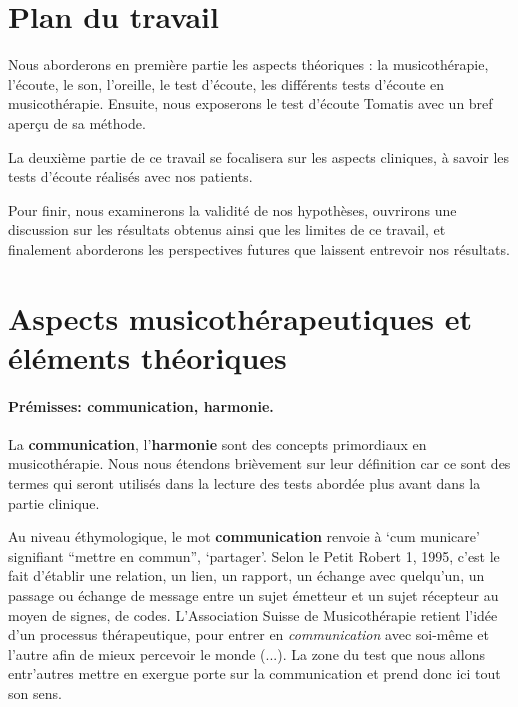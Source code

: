 	 


\section*{Plan du travail}


Nous aborderons en première partie les aspects théoriques : la musicothérapie, l'écoute, le son, l'oreille, le 
test d'écoute, les différents tests d'écoute en musicothérapie. Ensuite, nous 
exposerons le test d'écoute Tomatis avec un bref aperçu de sa méthode.

 
La deuxième partie de ce travail se focalisera sur les aspects
cliniques, à savoir les tests d'écoute réalisés  avec  nos patients. 

Pour finir, nous examinerons la validité de nos hypothèses, ouvrirons
une discussion sur les résultats obtenus ainsi que les limites de ce
travail, et finalement aborderons les perspectives futures que
laissent entrevoir nos résultats.



\section{{Aspects musicothérapeutiques et éléments théoriques}}


\paragraph{Prémisses: communication, harmonie.}



La \textbf{communication}, l'\textbf{harmonie} 
sont des concepts primordiaux en
musicothérapie. Nous nous étendons brièvement
sur leur définition car ce sont des termes qui seront utilisés dans la lecture
des tests abordée plus avant dans la partie clinique.

Au niveau éthymologique, le mot  \textbf{communication} renvoie à  `cum
municare' signifiant ``mettre en commun'', `partager'. Selon le Petit
Robert 1, 1995, c'est le fait d'établir une
relation, un lien, un rapport, un échange avec quelqu'un, un passage ou échange de message entre un sujet émetteur et un
sujet récepteur au moyen de signes, de codes. 
 L'Association Suisse de Musicothérapie retient l'idée d'un 
processus thérapeutique, pour entrer en \textit{communication }avec soi-même et
l'autre afin de mieux percevoir le monde
(...)\autocite{site_musitherapy}.
La zone du test que nous allons entr'autres mettre en exergue porte sur la
communication et prend donc ici tout son sens.

